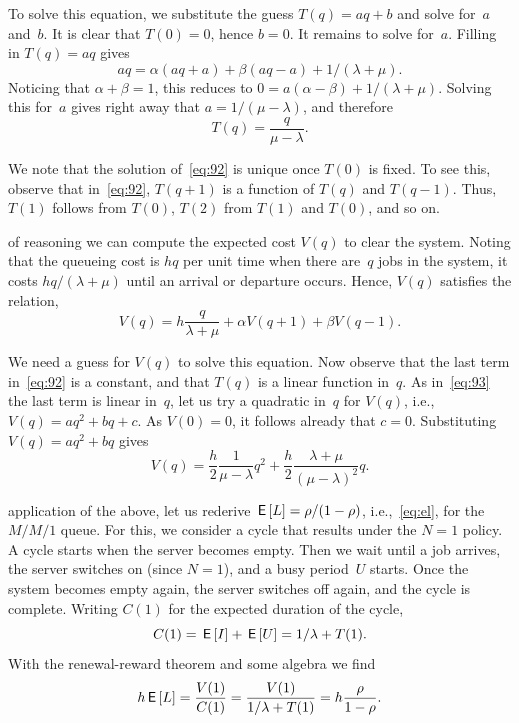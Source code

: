 \documentclass[queueing-book.tex]{subfiles}
\begin{document}
To solve this equation, we substitute the guess $T(q) = aq+b$ and solve for~$a$ and~$b$.
It is clear that $T(0)=0$, hence $b=0$.
It remains to solve for~$a$. Filling in $T(q)=aq$ gives
\begin{equation*}
  a q = \alpha (aq + a) + \beta (a q - a) + 1/(\lambda+\mu).
\end{equation*}
Noticing that $\alpha + \beta = 1$, this reduces to $0 = a(\alpha - \beta) + 1/(\lambda + \mu)$. Solving this for~$a$ gives right away that $a = 1/(\mu-\lambda)$, and therefore
\begin{equation*}
T(q) = \frac{q}{\mu-\lambda}.
\end{equation*}

We note that the solution of~\cref{eq:92} is unique once $T(0)$ is fixed. To see this, observe that in~\cref{eq:92}, $T(q+1)$ is a function of $T(q)$ and $T(q-1)$. Thus, $T(1)$ follows from $T(0)$, $T(2)$ from $T(1)$ and $T(0)$, and so on.


 of reasoning we can compute the expected cost $V(q)$ to clear the system.
Noting that the queueing cost is $hq$ per unit time when there are~$q$ jobs in the system, it costs $hq/(\lambda+\mu)$ until an arrival or departure occurs.
Hence, $V(q)$ satisfies the relation,
\begin{equation}\label{eq:93}
  V(q) = h\frac{q}{\lambda + \mu} + \alpha V(q+1) + \beta V(q-1).
\end{equation}


We need a guess for $V(q)$ to solve this equation.
Now observe that the last term in~\cref{eq:92} is a constant, and that $T(q)$ is a linear function in~$q$.
As in~\cref{eq:93} the last term is linear in~$q$,  let us try a quadratic in~$q$ for $V(q)$, i.e., $V(q)=a q^2 + b q + c$.
As $V(0)=0$, it follows already that $c=0$.
Substituting $V(q) = aq^2 + b q$ gives
\begin{equation*}
  V(q) = \frac h 2 \frac 1 {\mu -\lambda} q^2 + \frac h 2 \frac{\lambda + \mu}{(\mu - \lambda)^2}q.
\end{equation*}


 application of the above, let us rederive $\,\mathsf{E}\left[L\right] = \rho/(1-\rho)$, i.e.,~\cref{eq:el}, for the $M/M/1$ queue.
For this, we consider a cycle that results under the $N=1$ policy.
A cycle starts when the server becomes empty.
Then we wait until a job arrives, the server switches on (since $N=1$), and a busy period~$U$ starts.
Once the system becomes empty again, the server switches off again, and the cycle is complete.
Writing $C(1)$ for the expected duration of the cycle,
\begin{equation*}
C(1)=\,\mathsf{E}\left[I\right] + \,\mathsf{E}\left[U\right] = 1/\lambda + T(1).
\end{equation*}
With the renewal-reward theorem and some algebra we find
\begin{equation*}
h \,\mathsf{E}\left[L\right]=  \frac{V(1)}{C(1)} = \frac{V(1)}{1/\lambda + T(1)} =  h \frac{\rho}{1-\rho}.
\end{equation*}
\end{document}
